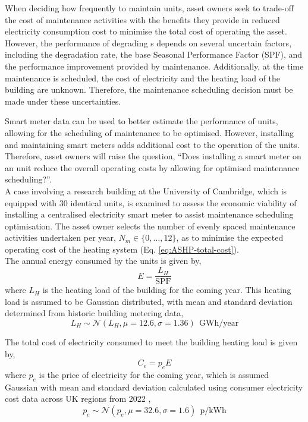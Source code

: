 When deciding how frequently to maintain  units, asset owners seek to trade-off the cost of maintenance activities with the benefits they provide in reduced electricity consumption cost to minimise the total cost of operating the  asset. However, the performance of degrading s depends on several uncertain factors, including the degradation rate, the base Seasonal Performance Factor (SPF), and the performance improvement provided by maintenance. Additionally, at the time maintenance is scheduled, the cost of electricity and the heating load of the building are unknown. Therefore, the maintenance scheduling decision must be made under these uncertainties.

Smart meter data can be used to better estimate the performance of  units, allowing for the scheduling of maintenance to be optimised. However, installing and maintaining smart meters adds additional cost to the operation of the  units. Therefore, asset owners will raise the question, ``Does installing a smart meter on an  unit reduce the overall operating costs by allowing for optimised maintenance scheduling?''.\\

A case involving a research building at the University of Cambridge, which is equipped with 30 identical  units, is examined to assess the economic viability of installing a centralised electricity smart meter to assist maintenance scheduling optimisation. The asset owner selects the number of evenly spaced maintenance activities undertaken per year, $N_m \in \{0,\ldots,12\}$, as to minimise the expected operating cost of the heating system (Eq. \ref{eq:ASHP-total-cost}).\\

\noindent
The annual energy consumed by the  units is given by,
\begin{equation}
    E = \frac{L_H}{\text{SPF}}
\end{equation}
where $L_H$ is the heating load of the building for the coming year. This heating load is assumed to be Gaussian distributed, with mean and standard deviation determined from historic building metering data,
\begin{equation}
    L_H \sim \mathcal{N}\left( L_H, \mu=12.6, \sigma=1.36 \right) \:\: \text{GWh/year}
\end{equation}

\noindent
The total cost of electricity consumed to meet the building heating load is given by,
\begin{equation}
    C_e = p_e E
\end{equation}
where $p_e$ is the price of electricity for the coming year, which is assumed Gaussian with mean and standard deviation calculated using consumer electricity cost data across UK regions from 2022 \citep{desnz2023AnnualDomesticEnergy},
\begin{equation}
    p_e \sim \mathcal{N}\left( p_e, \mu=32.6, \sigma=1.6 \right) \:\: \text{p/kWh}
\end{equation}

